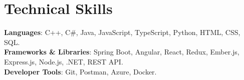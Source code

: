 \section{Technical Skills}
\begin{itemize}[leftmargin=0.15in, label={}]
    \small{\item{
        \textbf{Languages}{: C++, C\#, Java, JavaScript, TypeScript, Python, HTML, CSS, SQL.} \\
     
        \textbf{Frameworks \& Libraries}{: Spring Boot, Angular, React, Redux, Ember.js, Express.js, Node.js, .NET, REST API.} \\

        \textbf{Developer Tools}{: Git, Postman, Azure, Docker.} \\
    }}
\end{itemize}